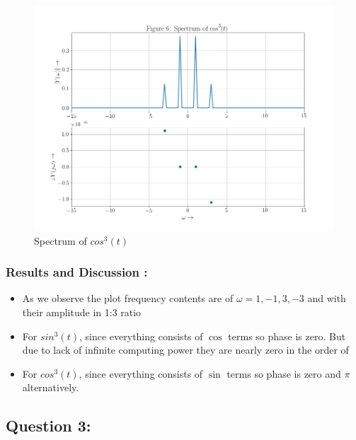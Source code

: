 \documentclass[11pt, a4paper]{article}
\begin{document}
  \begin{figure}[!tbh]
   \centering
   \includegraphics[scale=0.5]{./../Extras/fig9-6.png}  %
  \caption{Spectrum of $cos^{3}(t)$}
 \end{figure}
 \newpage
 \subsubsection{Results and Discussion :}\label{results-and-discussion}

 \begin{itemize}
 
 \item
   As we observe the plot frequency contents are of
   \(\omega = 1,-1,3,-3\) and with their amplitude in 1:3 ratio
   \item
   For \(sin^{3}(t)\), since everything consists of \(\cos \) terms so phase is zero. But due
   to lack of infinite computing power they are nearly zero in the order
   of \
   \item
   For \(cos^{3}(t)\), since everything consists of \(\sin \) terms so phase is zero and
   \(\pi\) alternatively.
 \end{itemize}
 \newpage

 \subsection{Question 3:}\label{question-3}
\end{document}
